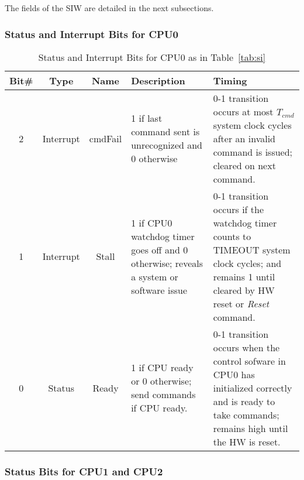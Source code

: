\documentclass{rep}
\theoremstyle{plain}
\begin{document}
The fields of the SIW are detailed in the next subsections.

\subsubsection{Status and Interrupt Bits for CPU0}

\begin{table}[H]
  \begin{center}
    \begin{tabular}{|c|c|c|p{4cm}|p{5cm}|}
      \hline
      \rowcolor{iob-green}
      \textbf{Bit\#}   & \textbf{Type} & \textbf{Name} &\textbf{Description} & \textbf{Timing} \\
      \hline
      \hline

      2 & Interrupt &  cmdFail & 1 if last command sent is unrecognized and 0
      otherwise & 0-1 transition occurs at most $T_{cmd}$ system clock cycles
      after an invalid command is issued; cleared on next command.\\ \hline

      \rowcolor{iob-blue} 
      1 & Interrupt & Stall & 1 if CPU0 watchdog timer goes off
      and 0 otherwise; reveals a system or software issue & 0-1 transition
      occurs if the watchdog timer counts to TIMEOUT system clock cycles; and
      remains 1 until cleared by HW reset or {\it Reset} command.\\ \hline

      0 & Status & Ready & 1 if CPU ready or 0 otherwise; send
      commands if CPU ready. & 0-1 transition occurs when the control
      sofware in CPU0 has initialized correctly and is ready to take
      commands; remains high until the HW is reset.\\ \hline

    \end{tabular}
    \caption{Status and Interrupt Bits for CPU0 as in Table~\ref{tab:si}}
    \label{tab:cpu0_status_interrpt}
  \end{center}
\end{table}
\clearpage

\subsubsection{Status Bits for CPU1 and CPU2}
\end{document}
